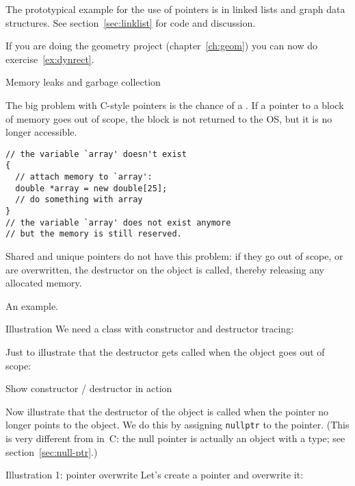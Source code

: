 The prototypical example for the use of pointers is in
linked lists and graph data structures.
See section~\ref{sec:linklist} for code and discussion.

\begin{exercise}
  If you are doing the geometry project (chapter~\ref{ch:geom})
  you can now do exercise~\ref{ex:dynrect}.
\end{exercise}

 {Memory leaks and garbage collection}
\label{sec:leak}

The big problem with C-style pointers is the chance of a
. If a pointer to a block of memory goes out of
scope, the block is not returned to the \ac{OS}, but it is no longer
accessible.
\begin{lstlisting}
// the variable `array' doesn't exist
{
  // attach memory to `array':
  double *array = new double[25];
  // do something with array
}
// the variable `array' does not exist anymore
// but the memory is still reserved.
\end{lstlisting}
Shared and unique
pointers do not have this problem: if they go out of scope, or are
overwritten, the destructor on the object is called, thereby releasing
any allocated memory.

An example.

\begin{block}{Illustration}
  \label{sl:construct-destruct-trace}
  We need a class with constructor and destructor tracing:
\end{block}

Just to illustrate that the destructor gets called when the object
goes out of scope:

\begin{block}{Show constructor / destructor in action}
  \label{sl:thing-con-dest}
\end{block}

Now illustrate that the destructor of the object is called
when the pointer no longer points to the object.
We do this by assigning \lstinline{nullptr} to the pointer.
(This is very different from  in~C:
the null pointer is actually an object with a type;
see section~\ref{sec:null-ptr}.)

\begin{block}{Illustration 1: pointer overwrite}
  \label{sl:shared-ptr-overwrite}
  Let's create a pointer and overwrite it:
\end{block}


